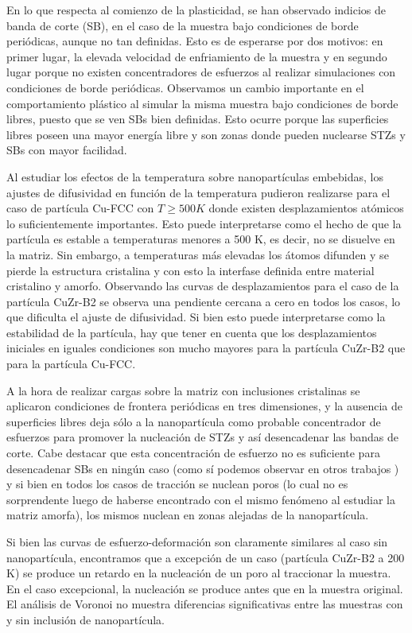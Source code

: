 En lo que respecta al comienzo de la plasticidad, se han observado indicios de banda de corte (SB), en el caso de la muestra bajo condiciones de borde periódicas, aunque no tan definidas. Esto es de esperarse por dos motivos: en primer lugar, la elevada velocidad de enfriamiento de la muestra y en segundo lugar porque no existen concentradores de esfuerzos al realizar simulaciones con condiciones de borde periódicas. Observamos un cambio importante en el comportamiento plástico al simular la misma muestra bajo condiciones de borde libres, puesto que se ven SBs bien definidas. Esto ocurre porque las superficies libres poseen una mayor energía libre y son zonas donde pueden nuclearse STZs y SBs con mayor facilidad.

Al estudiar los efectos de la temperatura sobre nanopartículas embebidas, los ajustes de difusividad en función de la temperatura pudieron realizarse para el caso de partícula Cu-FCC con $T \geq 500 K$ donde existen desplazamientos atómicos lo suficientemente importantes. Esto puede interpretarse como el hecho de que la partícula es estable a temperaturas menores a 500 K, es decir, no se disuelve en la matriz. Sin embargo, a temperaturas más elevadas los átomos difunden y se pierde la estructura cristalina y con esto la interfase definida entre material cristalino y amorfo. Observando las curvas de desplazamientos para el caso de la partícula CuZr-B2 se observa una pendiente cercana a cero en todos los casos, lo que dificulta el ajuste de difusividad. Si bien esto puede interpretarse como la estabilidad de la partícula, hay que tener en cuenta que los desplazamientos iniciales en iguales condiciones son mucho mayores para la partícula CuZr-B2 que para la partícula Cu-FCC.

A la hora de realizar cargas sobre la matriz con inclusiones cristalinas se aplicaron condiciones de frontera periódicas en tres dimensiones, y la ausencia de superficies libres deja sólo a la nanopartícula como probable concentrador de esfuerzos para promover la nucleación de STZs y así desencadenar las bandas de corte. Cabe destacar que esta concentración de esfuerzo no es suficiente para desencadenar SBs en ningún caso (como sí podemos observar en otros trabajos \citep{albe13,brink15,adibi13,adibi14}) y si bien en todos los casos de tracción se nuclean poros (lo cual no es sorprendente luego de haberse encontrado con el mismo fenómeno al estudiar la matriz amorfa), los mismos nuclean en zonas alejadas de la nanopartícula.

Si bien las curvas de esfuerzo-deformación son claramente similares al caso sin nanopartícula, encontramos que a excepción de un caso (partícula CuZr-B2 a 200 K) se produce un retardo en la nucleación de un poro al traccionar la muestra. En el caso excepcional, la nucleación se produce antes que en la muestra original. El análisis de Voronoi no muestra diferencias significativas entre las muestras con y sin inclusión de nanopartícula. 

